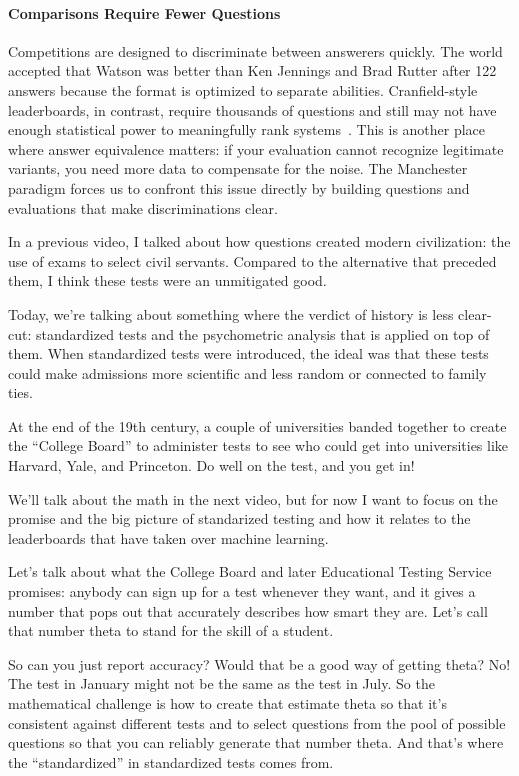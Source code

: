 \paragraph{Comparisons Require Fewer Questions}
%
Competitions are designed to discriminate between answerers quickly. The world
accepted that Watson was better than Ken Jennings and Brad Rutter after 122
answers because the format is optimized to separate abilities. Cranfield-style
leaderboards, in contrast, require thousands of questions and still may not
have enough statistical power to meaningfully rank systems~\citep{card2020power,Rodriguez-21:leaderboards}.
This is another place where answer equivalence matters: if your evaluation
cannot recognize legitimate variants, you need more data to compensate for the
noise. The Manchester paradigm forces us to confront this issue directly by
building questions and evaluations that make discriminations clear.


In a previous video, I talked about how questions created modern civilization:
the use of exams to select civil servants.  Compared to the alternative that
preceded them, I think these tests were an unmitigated good.

Today, we’re talking about something where the verdict of history is less
clear-cut: standardized tests and the psychometric analysis that is applied on
top of them.  When standardized tests were introduced, the ideal was that
these tests could make admissions more scientific and less random or connected
to family ties.

At the end of the 19th century, a couple of universities banded together to
create the ``College Board'' to administer tests to see who could get into
universities like Harvard, Yale, and Princeton.  Do well on the test, and you
get in!

We’ll talk about the math in the next video, but for now I want to focus on
the promise and the big picture of standarized testing and how it relates to
the leaderboards that have taken over machine learning.

Let’s talk about what the College Board and later Educational Testing Service
promises: anybody can sign up for a test whenever they want, and it gives a
number that pops out that accurately describes how smart they are.  Let’s call
that number theta to stand for the skill of a student.

So can you just report accuracy?  Would that be a good way of getting theta?
No!  The test in January might not be the same as the test in July.  So the
mathematical challenge is how to create that estimate theta so that it’s
consistent against different tests and to select questions from the pool of
possible questions so that you can reliably generate that number theta.  And
that’s where the ``standardized'' in standardized tests comes from.

